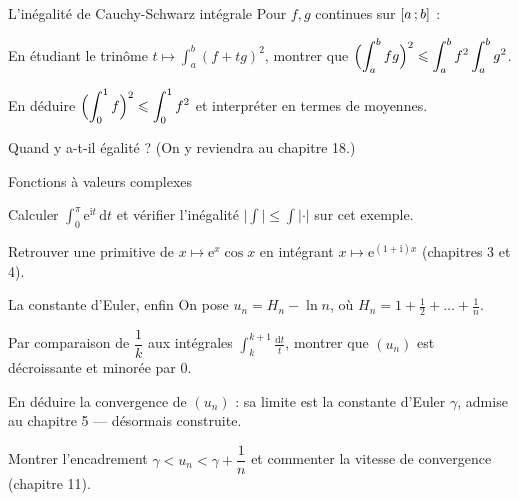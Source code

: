 \begin{exercice}[2]{L'inégalité de Cauchy-Schwarz intégrale}
Pour $f,g$ continues sur $\mathopen{[}a\,{;}\,b\mathclose{]}$ :
\begin{questions}
  \item En étudiant le trinôme
    $t\mapsto\displaystyle\int_{a}^{b}(f+tg)^{2}$, montrer que
    $\Bigl(\displaystyle\int_{a}^{b}fg\Bigr)^{2}
    \leqslant\displaystyle\int_{a}^{b}f^{2}\int_{a}^{b}g^{2}$.
  \item En déduire
    $\Bigl(\displaystyle\int_{0}^{1}f\Bigr)^{2}
    \leqslant\displaystyle\int_{0}^{1}f^{2}$ et interpréter en termes de
    moyennes.
  \item Quand y a-t-il égalité ? (On y reviendra au chapitre 18.)
\end{questions}
\end{exercice}

\begin{exercice}[2]{Fonctions à valeurs complexes}
\begin{questions}
  \item Calculer $\displaystyle\int_{0}^{\pi}\mathrm{e}^{\mathrm{i}t}\,\mathrm{d}t$
    et vérifier l'inégalité
    $\bigl|\int\bigr|\leqslant\int|\cdot|$ sur cet exemple.
  \item Retrouver une primitive de $x\mapsto\mathrm{e}^{x}\cos x$ en
    intégrant $x\mapsto\mathrm{e}^{(1+\mathrm{i})x}$ (chapitres 3 et 4).
\end{questions}
\end{exercice}


\begin{exercice}[3]{La constante d'Euler, enfin}
On pose $u_n=H_n-\ln n$, où $H_n=1+\frac12+\dots+\frac1n$.
\begin{questions}
  \item Par comparaison de $\dfrac1k$ aux intégrales
    $\displaystyle\int_{k}^{k+1}\frac{\mathrm{d}t}{t}$, montrer que
    $(u_n)$ est décroissante et minorée par $0$.
  \item En déduire la convergence de $(u_n)$ : sa limite est la constante
    d'Euler $\gamma$, admise au chapitre 5 — désormais construite.
  \item Montrer l'encadrement $\gamma<u_n<\gamma+\dfrac1n$ et commenter la
    vitesse de convergence (chapitre 11).
\end{questions}
\end{exercice}

